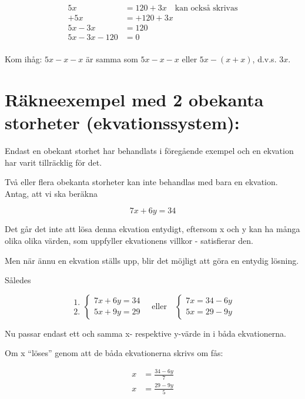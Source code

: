 \begin{align*}
  5x &= 120 + 3x \quad \text{kan också skrivas} \\
  +5x &= +120+ 3x \\
  5x-3x &= 120 \\
  5x- 3x-120 &= 0 \\
\end{align*}

Kom ihåg: \(5x-x-x\) är samma som \(5x-x-x\) eller \(5x-(x+x)\), d.v.s. \(3x\).

\section{Räkneexempel med 2 obekanta storheter (ekvationssystem):}

Endast en obekant storhet har behandlats i föregående exempel och en ekvation
har varit tillräcklig för det.

Två eller flera obekanta storheter kan inte behandlas med bara en ekvation.
Antag, att vi ska beräkna

\[7x+6y=34\]

Det går det inte att lösa denna ekvation entydigt, eftersom x och y kan ha många
olika olika värden, som uppfyller ekvationens villkor - satisfierar den.

Men när ännu en ekvation ställs upp, blir det möjligt att göra en entydig
lösning.

Således

\[
\begin{array}{c}
1.\\2.
\end{array}
\left\{
\begin{array}{l}
7x + 6y = 34\\
5x + 9y = 29
\end{array}
\right.
\quad \text{eller} \quad
\left\{
\begin{array}{l}
7x = 34 - 6y\\
5x = 29 - 9y 
\end{array}
\right. 
\]

Nu passar endast ett och samma x- respektive y-värde in i båda ekvationerna.

Om x ``löses'' genom att de båda ekvationerna skrivs om fås:

\begin{align}
  \label{eq:1}
  x &= \frac{34-6y}{7}\\
  \label{eq:2}
  x &= \frac{29-9y}{5}
\end{align}

